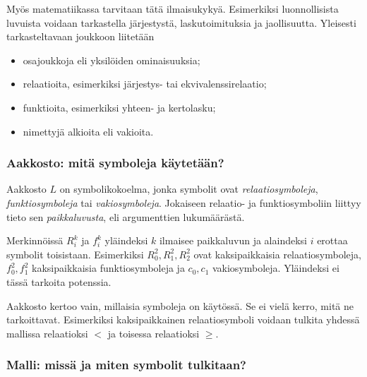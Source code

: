 \documentclass[11pt,a4paper]{amsart}
\begin{document}
\newpage
Myös matematiikassa tarvitaan tätä ilmaisukykyä. Esimerkiksi luonnollisista
luvuista voidaan tarkastella järjestystä, laskutoimituksia ja jaollisuutta.
Yleisesti tarkasteltavaan joukkoon liitetään
\begin{itemize}
  \item osajoukkoja eli yksilöiden ominaisuuksia;
  \item relaatioita, esimerkiksi järjestys- tai ekvivalenssirelaatio;
  \item funktioita, esimerkiksi yhteen- ja kertolasku;
  \item nimettyjä alkioita eli vakioita.
\end{itemize}

\subsubsection{Aakkosto: mitä symboleja käytetään?}

\begin{definition}[Aakkosto]
  Aakkosto $L$ on symbolikokoelma, jonka symbolit ovat
  \emph{relaatiosymboleja}, \emph{funktiosymboleja} tai
  \emph{vakiosymboleja}. Jokaiseen relaatio- ja funktiosymboliin liittyy
  tieto sen \emph{paikkaluvusta}, eli argumenttien lukumäärästä.
\end{definition}

Merkinnöissä $R_i^k$ ja $f_i^k$ yläindeksi $k$ ilmaisee paikkaluvun ja
alaindeksi $i$ erottaa symbolit toisistaan. Esimerkiksi $R_0^2,R_1^2,R_2^2$
ovat kaksipaikkaisia relaatiosymboleja, $f_0^2,f_1^2$ kaksipaikkaisia
funktiosymboleja ja $c_0,c_1$ vakiosymboleja. Yläindeksi ei tässä tarkoita
potenssia.

\begin{remark}
  Aakkosto kertoo vain, millaisia symboleja on käytössä. Se ei vielä
  kerro, mitä ne tarkoittavat. Esimerkiksi kaksipaikkainen relaatiosymboli
  voidaan tulkita yhdessä mallissa relaatioksi $<$ ja toisessa
  relaatioksi $\geq$.
\end{remark}

\subsubsection{Malli: missä ja miten symbolit tulkitaan?}
\end{document}

